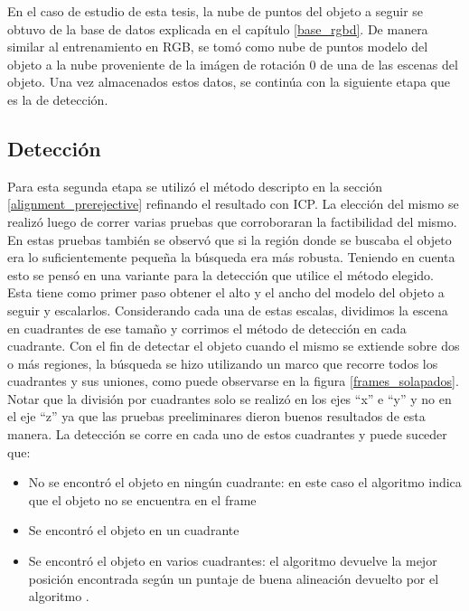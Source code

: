 En el caso de estudio de esta tesis, la nube de puntos del objeto a seguir se obtuvo de la base de datos explicada en el capítulo \ref{base_rgbd}. De manera similar al entrenamiento en RGB, se tomó como nube de puntos modelo del objeto a la nube proveniente de la imágen de rotación 0 de una de las escenas del objeto. Una vez almacenados estos datos, se continúa con la siguiente etapa que es la de detección.


\subsection{Detección}
Para esta segunda etapa se utilizó el método descripto en la sección \ref{alignment_prerejective} refinando el resultado con ICP. La elección del mismo se realizó luego de correr varias pruebas que corroboraran la factibilidad del mismo. En estas pruebas también se observó que si la región donde se buscaba el objeto era lo suficientemente pequeña la búsqueda era más robusta. Teniendo en cuenta esto se pensó en una variante para la detección que utilice el método elegido. Esta tiene como primer paso obtener el alto y el ancho del modelo del objeto a seguir y escalarlos. Considerando cada una de estas escalas, dividimos la escena en cuadrantes de ese tamaño y corrimos el método de detección en cada cuadrante. Con el fin de detectar el objeto cuando el mismo se extiende sobre dos o más regiones, la búsqueda se hizo utilizando un marco que recorre todos los cuadrantes y sus uniones, como puede observarse en la figura \ref{frames_solapados}. Notar que la división por cuadrantes solo se realizó en los ejes ``x'' e ``y'' y no en el eje ``z'' ya que las pruebas preeliminares dieron buenos resultados de esta manera. La detección se corre en cada uno de estos cuadrantes y puede suceder que:
\begin{itemize}
	\item No se encontró el objeto en ningún cuadrante: en este caso el algoritmo indica que el objeto no se encuentra en el frame
	\item Se encontró el objeto en un cuadrante
	\item Se encontró el objeto en varios cuadrantes: el algoritmo devuelve la mejor posición encontrada según un puntaje de buena alineación devuelto por el algoritmo \ap.
\end{itemize}

